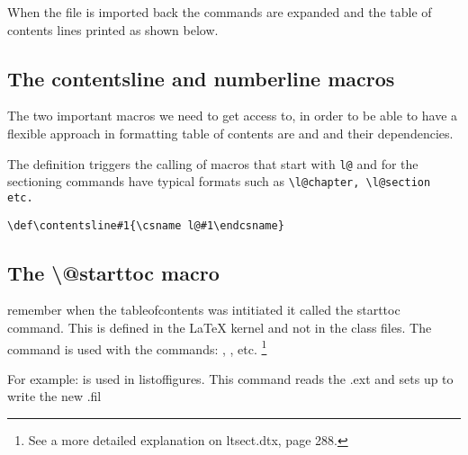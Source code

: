 When the file is imported back the commands are expanded and the table of contents lines printed as shown below.



\begin{tcolorbox}[title=Extract from .toc file]
\relax
{}
\relax
{}
\relax
{}
\relax
{}
\end{tcolorbox}

\subsection{The contentsline and numberline macros}

The two important macros we need to get access to, in order to be able to have a flexible approach in formatting table of contents are  and  and their dependencies.

The  definition triggers the calling of macros that start with \verb+l@+ and for the sectioning commands have typical formats such as \lstinline{\l@chapter, \l@section etc.}

\begin{tcolorbox}
\begin{lstlisting}
\def\contentsline#1{\csname l@#1\endcsname}
\end{lstlisting}
\end{tcolorbox}

\subsection{The \textbackslash @starttoc macro}

remember when the tableofcontents was intitiated it called the starttoc command. This is defined in the LaTeX kernel and not in the class files. The  command is used with the commands:
, , etc. \footnote{See a more detailed explanation on ltsect.dtx, page 288.}

For example:  is used in listoffigures. This command
reads the .ext and sets up to write the new .fil

